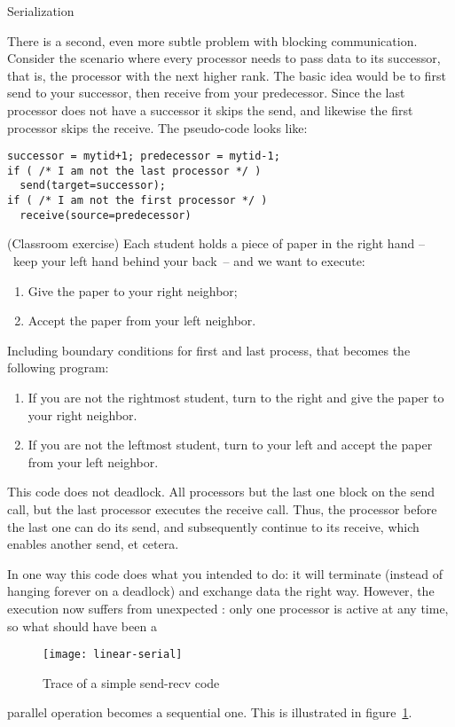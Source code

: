 
 {Serialization}
\label{sec:serialization}

There is a second, even more subtle problem with blocking
communication. Consider the scenario where every processor needs to
pass data to its successor, that is, the processor with the next
higher rank. The basic idea would be to first send to your successor,
then receive from your predecessor. Since the last processor does not
have a successor it skips the send, and likewise the first processor
skips the receive. The pseudo-code looks like:
\begin{lstlisting}
successor = mytid+1; predecessor = mytid-1;
if ( /* I am not the last processor */ )
  send(target=successor);
if ( /* I am not the first processor */ )
  receive(source=predecessor)
\end{lstlisting}

\begin{exercise}
  \label{ex:serialsend}
  (Classroom exercise) Each student holds a piece of paper
  in the right hand --~keep your left hand behind your back~--
  and we want to execute:
  \begin{enumerate}
  \item Give the paper to your right neighbor;
  \item Accept the paper from your left neighbor.
  \end{enumerate}
  Including boundary conditions for first and last process, that becomes
  the following program:
  \begin{enumerate}
  \item If you are not the rightmost student, turn to the right
    and give the paper to your right neighbor.
  \item If you are not the leftmost student, turn to your left and
    accept the paper from your left neighbor.
  \end{enumerate}
\end{exercise}

This code does not deadlock. All processors but the last one block on
the send call, but the last processor executes the receive call. Thus,
the processor before the last one can do its send, and subsequently
continue to its receive, which enables another send, et cetera.

In one way this code does what you intended to do:
it will terminate (instead of hanging forever on a
deadlock) and exchange data the right way. However, the execution
now suffers from unexpected : only
one processor is active at any time, so what should have been a
%
\begin{figure}[ht]
\texttt{[image: linear-serial]}
\caption{Trace of a simple send-recv code}
\label{fig:serialization}
\end{figure}
%
parallel operation becomes a sequential one. This is illustrated in
figure~\ref{fig:serialization}.

